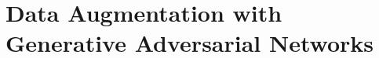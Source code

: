 \chapter[Data Augmentation with Generative Adversarial
Networks]{Data Augmentation with \\ Generative Adversarial
Networks}








